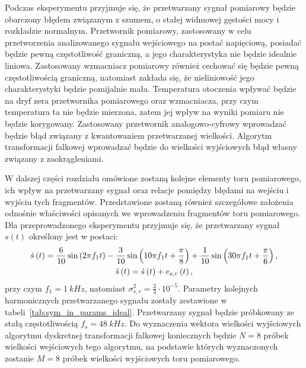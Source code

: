 Podczas eksperymentu przyjmuje się, że przetwarzany sygnał pomiarowy będzie obarczony błędem związanym z szumem, o stałej widmowej gęstości mocy i rozkładzie normalnym. Przetwornik pomiarowy, zastosowany w celu przetworzenia analizowanego sygnału wejściowego na postać napięciową, posiadać będzie pewną częstotliwość graniczną, a jego charakterystyka nie będzie idealnie liniowa. Zastosowany wzmacniacz pomiarowy również cechować się będzie pewną częstotliwością graniczną, natomiast zakłada się, że nieliniowość jego charakterystyki będzie pomijalnie mała. Temperatura otoczenia wpływać będzie na dryf zera przetwornika pomiarowego oraz wzmacniacza, przy czym temperatura ta nie będzie mierzona, zatem jej wpływ na wyniki pomiaru nie będzie korygowany. Zastosowany przetwornik analogowo-cyfrowy wprowadzać będzie błąd związany z kwantowaniem przetwarzanej wielkości. Algorytm transformacji falkowej wprowadzać będzie do wielkości wyjściowych błąd własny związany z zaokrągleniami.

W dalszej części rozdziału omówione zostaną kolejne elementy toru pomiarowego, ich wpływ na przetwarzany sygnał oraz relacje pomiędzy błędami na wejściu i wyjściu tych fragmentów. Przedstawione zostaną również szczegółowe założenia odnośnie właściwości opisanych we wprowadzeniu fragmentów toru pomiarowego. Dla przeprowadzonego eksperymentu przyjmuje się, że przetwarzany sygnał $s(t)$ określony jest w postaci:
\begin{gather}
\dot{s} \left(t\right) = \frac{6}{10} \sin \left( 2 \pi f_{1} t \right) - \frac{3}{10} \sin \left( 10 \pi f_{1} t + \frac{\pi}{8} \right) + \frac{1}{10} \sin \left( 30 \pi f_{1} t + \frac{\pi}{6} \right) \label{eq:sym_in_ideal}, \\
\tilde{s} \left(t\right) = \dot{s} \left(t\right) + e_{s,r} \left(t\right) \label{eq:sym_in_real},
\end{gather}
przy czym $f_{1} = \qty{1}{kHz}$, natomiast $\sigma_{s,r}^{2} = \frac{2}{3} \cdot 10^{-5}$. Parametry kolejnych harmonicznych przetwarzanego sygnału zostały zestawione w tabeli~\ref{tab:sym_in_params_ideal}. Przetwarzany sygnał będzie próbkowany ze stałą częstotliwością $f_{s} = \qty{48}{kHz}$. Do wyznaczenia wektora wielkości wyjściowych algorytmu dyskretnej transformacji falkowej koniecznych będzie $N = 8$ próbek wielkości wejściowych tego algorytmu, na podstawie których wyznaczonych zostanie $M = 8$ próbek wielkości wyjściowych toru pomiarowego.

